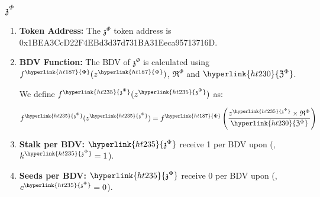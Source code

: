 \documentclass[class=article, crop=false]{standalone}
\begin{document}
\subsubsection{$\mathfrak{z}^{\Phi}$}
    \begin{enumerate}
        \item \textbf{Token Address:} The \hyperlink{ht235}{$\mathfrak{z}^{\Phi}$} token address is 0x1BEA3CcD22F4EBd3d37d731BA31Eeca95713716D.
        \item \textbf{BDV Function:} The BDV of \hyperlink{ht235}{$\mathfrak{z}^{\Phi}$} is calculated using $f^{\hyperlink{ht187}{\Phi}}(z^{\hyperlink{ht187}{\Phi}})$, $\mathfrak{R}^{\Phi}$ and $\hyperlink{ht230}{\mathfrak{Z}^{\Phi}}$. 
        
        We define $f^{\hyperlink{ht235}{\mathfrak{z}^{\Phi}}}(z^{\hyperlink{ht235}{\mathfrak{z}^{\Phi}}})$ as:
        
            $$f^{\hyperlink{ht235}{\mathfrak{z}^{\Phi}}}(z^{\hyperlink{ht235}{\mathfrak{z}^{\Phi}}}) = f^{\hyperlink{ht187}{\Phi}}\left(\frac{z^{\hyperlink{ht235}{\mathfrak{z}^{\Phi}}} \times \mathfrak{R}^{\Phi}}{\hyperlink{ht230}{\mathfrak{Z}^{\Phi}}}\right)$$
                
        \item \textbf{Stalk per BDV:} $\hyperlink{ht235}{\mathfrak{z}^{\Phi}}$  receive 1  per BDV upon  (, $k^{\hyperlink{ht235}{\mathfrak{z}^{\Phi}}} = 1$).
        \item \textbf{Seeds per BDV:} $\hyperlink{ht235}{\mathfrak{z}^{\Phi}}$  receive 0  per BDV upon  (, $c^{\hyperlink{ht235}{\mathfrak{z}^{\Phi}}} = 0$).
    \end{enumerate}
\end{document}
